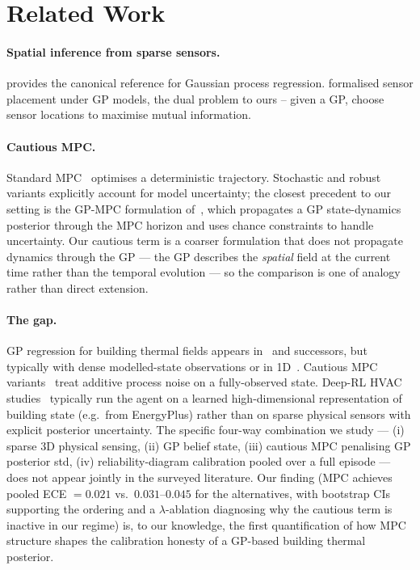 \documentclass[11pt,letterpaper]{article}
\begin{document}
\section{Related Work}

\paragraph{Spatial inference from sparse sensors.}
\citet{rasmussen2006} provides the canonical reference for Gaussian
process regression. \citet{krause2008} formalised sensor placement
under GP models, the dual problem to ours -- given a GP, choose sensor
locations to maximise mutual information.

\paragraph{Cautious MPC.}
Standard MPC~\citep{camacho2007} optimises a deterministic trajectory.
Stochastic and robust variants explicitly account for model
uncertainty; the closest precedent to our setting is the
GP-MPC formulation of~\citet{hewing2020}, which propagates a GP
state-dynamics posterior through the MPC horizon and uses chance
constraints to handle uncertainty. Our cautious term is a coarser
formulation that does not propagate dynamics through the GP --- the
GP describes the \emph{spatial} field at the current time rather than
the temporal evolution --- so the comparison is one of analogy rather
than direct extension.

\paragraph{The gap.}
GP regression for building thermal fields appears in~\citep{rasmussen2006}
and successors, but typically with dense modelled-state observations or
in 1D~\citep{kocijan2003}. Cautious MPC variants~\citep{hewing2020}
treat additive process noise on a fully-observed state. Deep-RL HVAC
studies~\citep{wei2017, drgona2020} typically run the agent on a learned
high-dimensional representation of building state (e.g.\ from
EnergyPlus) rather than on sparse physical sensors with explicit
posterior uncertainty. The specific four-way combination we study ---
(i) sparse 3D physical sensing, (ii) GP belief state, (iii) cautious
MPC penalising GP posterior std, (iv) reliability-diagram calibration
pooled over a full episode --- does not appear jointly in the surveyed
literature. Our finding (MPC achieves pooled ECE $= 0.021$ vs.\
$0.031$--$0.045$ for the alternatives, with bootstrap CIs supporting
the ordering and a $\lambda$-ablation diagnosing why the cautious term
is inactive in our regime) is, to our knowledge, the first
quantification of how MPC structure shapes the calibration honesty of
a GP-based building thermal posterior.
\end{document}
